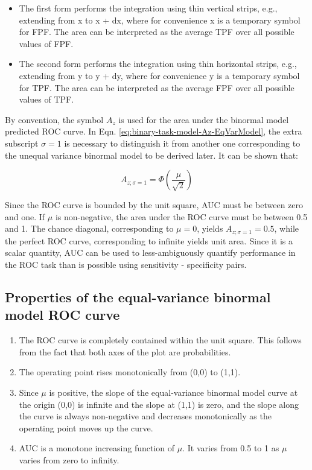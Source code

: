 \documentclass[
]{book}
\providecommand{\tightlist}{%
  \setlength{\itemsep}{0pt}\setlength{\parskip}{0pt}}
\begin{document}
\begin{itemize}
\tightlist
\item
  The first form performs the integration using thin vertical strips, e.g., extending from x to x + dx, where for convenience x is a temporary symbol for FPF. The area can be interpreted as the average TPF over all possible values of FPF.
\item
  The second form performs the integration using thin horizontal strips, e.g., extending from y to y + dy, where for convenience y is a temporary symbol for TPF. The area can be interpreted as the average FPF over all possible values of TPF.
\end{itemize}

By convention, the symbol \(A_z\) is used for the area under the binormal model predicted ROC curve. In Eqn. \eqref{eq:binary-task-model-Az-EqVarModel}, the extra subscript \(\sigma = 1\) is necessary to distinguish it from another one corresponding to the unequal variance binormal model to be derived later. It can be shown that:

\begin{equation} 
A_{z;\sigma = 1} = \Phi\left ( \frac{\mu} {\sqrt{2}} \right )
\label{eq:binary-task-model-az-var}
\end{equation}

Since the ROC curve is bounded by the unit square, AUC must be between zero and one. If \(\mu\) is non-negative, the area under the ROC curve must be between 0.5 and 1. The chance diagonal, corresponding to \(\mu = 0\), yields \(A_{z;\sigma = 1} = 0.5\), while the perfect ROC curve, corresponding to infinite yields unit area. Since it is a scalar quantity, AUC can be used to less-ambiguously quantify performance in the ROC task than is possible using sensitivity - specificity pairs.

\hypertarget{binary-task-model-properties-roc}{%
\subsection{Properties of the equal-variance binormal model ROC curve}\label{binary-task-model-properties-roc}}

\begin{enumerate}
\def\labelenumi{\alph{enumi}.}
\tightlist
\item
  The ROC curve is completely contained within the unit square. This follows from the fact that both axes of the plot are probabilities.
\item
  The operating point rises monotonically from (0,0) to (1,1).
\item
  Since \(\mu\) is positive, the slope of the equal-variance binormal model curve at the origin (0,0) is infinite and the slope at (1,1) is zero, and the slope along the curve is always non-negative and decreases monotonically as the operating point moves up the curve.
\item
  AUC is a monotone increasing function of \(\mu\). It varies from 0.5 to 1 as \(\mu\) varies from zero to infinity.
\end{enumerate}
\end{document}
